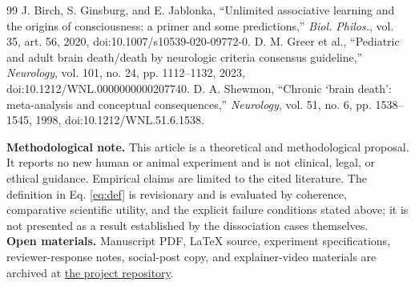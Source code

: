 \begin{thebibliography}{99}
 J. Birch, S. Ginsburg, and E. Jablonka, ``Unlimited associative learning and the origins of consciousness: a primer and some predictions,'' \emph{Biol. Philos.}, vol. 35, art. 56, 2020, doi:10.1007/s10539-020-09772-0.
 D. M. Greer et al., ``Pediatric and adult brain death/death by neurologic criteria consensus guideline,'' \emph{Neurology}, vol. 101, no. 24, pp. 1112--1132, 2023, doi:10.1212/WNL.0000000000207740.
 D. A. Shewmon, ``Chronic `brain death': meta-analysis and conceptual consequences,'' \emph{Neurology}, vol. 51, no. 6, pp. 1538--1545, 1998, doi:10.1212/WNL.51.6.1538.
\end{thebibliography}

\vspace{0.5em}
\noindent\footnotesize\textbf{Methodological note.} This article is a theoretical and methodological proposal. It reports no new human or animal experiment and is not clinical, legal, or ethical guidance. Empirical claims are limited to the cited literature. The definition in Eq. \ref{eq:def} is revisionary and is evaluated by coherence, comparative scientific utility, and the explicit failure conditions stated above; it is not presented as a result established by the dissociation cases themselves.\\[0.35em]\textbf{Open materials.} Manuscript PDF, LaTeX source, experiment specifications, reviewer-response notes, social-post copy, and explainer-video materials are archived at \href{\repoURL}{the project repository}.


